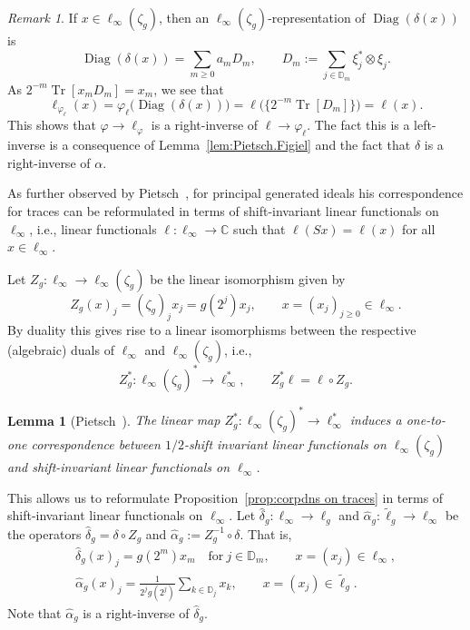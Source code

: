\documentclass[10pt, a4paper]{amsart}
\newcommand{\C}{\mathbb{C}}
\newcommand{\D}{\mathbb{D}}
\newcommand{\op}{\operatorname}
\newcommand{\Tr}{\op{Tr}}
\numberwithin{equation}{section}
\newtheorem{lemma}[theorem]{Lemma}
\theoremstyle{definition}
\theoremstyle{remark}
\newtheorem{remark}[theorem]{Remark}
\newcommand{\Diag}{\op{Diag}}
\begin{document}
\begin{remark}
 If $x\in \ell_\infty(\zeta_g)$, then an  $ \ell_\infty(\zeta_g)$-representation of $\Diag(\delta(x))$ is
\begin{equation*}
 \Diag(\delta(x)) = \sum_{m\geq 0} a_m D_m, \qquad D_m:=\sum_{j\in \D_m} \xi_j^*\otimes \xi_j.
\end{equation*}
As $2^{-m}\Tr[x_mD_m]=x_m$, we see that
\begin{equation*}
\ell_{\varphi_{\ell}}(x)=\varphi_\ell\big(\Diag(\delta(x))\big) = \ell\big(\{2^{-m}\Tr[D_m]\}\big)=\ell(x).
\end{equation*}
This shows that $\varphi \rightarrow \ell_\varphi$ is a right-inverse of $\ell \rightarrow \varphi_\ell$. The fact this is a left-inverse is a consequence of Lemma~\ref{lem:Pietsch.Figiel} and the fact that $\delta$ is a right-inverse of $\alpha$.
\end{remark}

As further observed by Pietsch~\cite[Lemma~6.1]{Pi:AM20}, for principal generated ideals his correspondence for traces can be reformulated in terms of shift-invariant linear functionals on $\ell_\infty$, i.e., linear functionals $\ell: \ell_\infty \rightarrow \C$ such that $\ell(Sx)=\ell(x)$ for all $x\in \ell_\infty$.

Let $Z_g:\ell_\infty \rightarrow \ell_\infty(\zeta_g)$ be the linear isomorphism given by
\begin{equation*}
 Z_g(x)_j=(\zeta_g)_jx_j=g(2^j)x_j, \qquad x=(x_j)_{j\geq 0} \in \ell_\infty.
\end{equation*}
By duality this gives rise to a linear isomorphisms between the respective (algebraic) duals of $\ell_\infty$ and $\ell_\infty(\zeta_g)$, i.e.,
\begin{equation*}
 Z_g^*:\ell_\infty(\zeta_g)^*\longrightarrow \ell_\infty^*, \qquad Z_g^*\ell =\ell\circ Z_g.
\end{equation*}

\begin{lemma}[Pietsch~{\cite[Lemma~6.1]{Pi:AM20}}]
 The linear map  $Z_g^*:\ell_\infty(\zeta_g)^*\longrightarrow \ell_\infty^*$ induces a one-to-one correspondence between  $1/2$-shift invariant linear functionals on $\ell_\infty(\zeta_g)$ and shift-invariant linear functionals on $\ell_\infty$.
\end{lemma}

This allows us to reformulate Proposition~\ref{prop:corpdns on traces} in terms of shift-invariant linear functionals on $\ell_\infty$. Let $\hat{\delta}_g: \ell_\infty\rightarrow \ell_g$ and
$\hat{\alpha}_g:\tilde{\ell}_g \rightarrow \ell_\infty$ be the operators $\hat{\delta}_g=\delta\circ Z_g$ and $\hat{\alpha}_g:=Z_g^{-1}\circ \delta$. That is,
\begin{gather}
  \hat{\delta}_g (x)_j= g(2^m)x_m \quad \text{for} \ j\in \D_m, \qquad x=(x_j)\in \ell_\infty,\label{def:hat delta}\\
\hat{\alpha}_g(x)_j= \frac{1}{2^jg(2^j)} \sum_{k\in \D_j} x_k, \qquad x=(x_j)\in \tilde{\ell}_g.\label{def:hat alpha}
\end{gather}
Note that $\hat{\alpha}_g$ is a right-inverse of $\hat{\delta}_g$.
\end{document}
